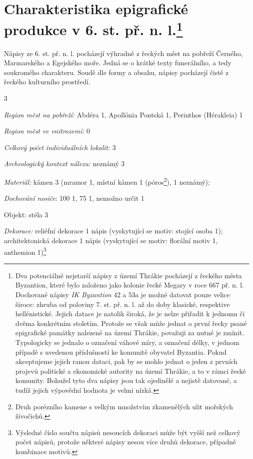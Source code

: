 \section[charakteristika-epigrafické-produkce-v-6.-st.-př.-n.-l.]{Charakteristika epigrafické produkce v 6. st. př. n. l.\footnote{Dva potenciálně nejstarší nápisy z území Thrákie pocházejí z řeckého města Byzantion, které bylo založeno jako kolonie řecké Megary v roce 667 př. n. l. Dochované nápisy {\em IK Byzantion} 42 a 53a je možné datovat pouze velice široce: zhruba od poloviny 7. st. př. n. l. až do doby klasické, respektive hellénistické. Jejich datace je natolik široká, že je nelze přiřadit k jednomu či dvěma konkrétním stoletím. Protože se však může jednat o první řecky psané epigrafické památky nalezené na území Thrákie, považuji za nutné je zmínit. Typologicky se jednalo o označení váhové míry, a označení délky, v jednom případě s uvedenou příslušností ke komunitě obyvatel Byzantia. Pokud akceptujeme jejich ranou dataci, pak by se mohlo jednat o jeden z prvních projevů politické a ekonomické autority na území Thrákie, a to v rámci řecké komunity. Bohužel tyto dva nápisy jsou tak ojedinělé a nejistě datované, a tudíž jejich výpovědní hodnota je velmi nízká.}}

Nápisy ze 6. st. př. n. l. pocházejí výhradně z řeckých měst na pobřeží Černého, Marmarského a Egejského moře. Jedná se o krátké texty funerálního, a tedy soukromého charakteru. Soudě dle formy a obsahu, nápisy pocházejí čistě z řeckého kulturního prostředí.

\placetable[none]{}
\starttable[|l|]
\HL
{} 3

{\em Region měst na pobřeží:} Abdéra 1, Apollónia Pontská 1, Perinthos (Hérakleia) 1

{\em Region měst ve vnitrozemí:} 0

{\em Celkový počet individuálních lokalit:} 3

{\em Archeologický kontext nálezu:} neznámý 3

{\em Materiál:} kámen 3 (mramor 1, místní kámen 1 (póros\footnote{Druh porézního kamene s velkým množstvím zkamenělých ulit mořských živočichů.}), 1 neznámý);

{\em Dochování nosiče}: 100  1, 75  1, nemožno určit 1

Objekt: stéla 3

{\em Dekorace:} reliéfní dekorace 1 nápis (vyskytující se motiv: stojící osoba 1); architektonická dekorace 1 nápis (vyskytující se motiv: florální motiv 1, anthemion 1)\footnote{Výsledné číslo součtu nápisů nesoucích dekoraci může být vyšší než celkový počet nápisů, protože některé nápisy nesou více druhů dekorace, případně kombinace motivů.}


